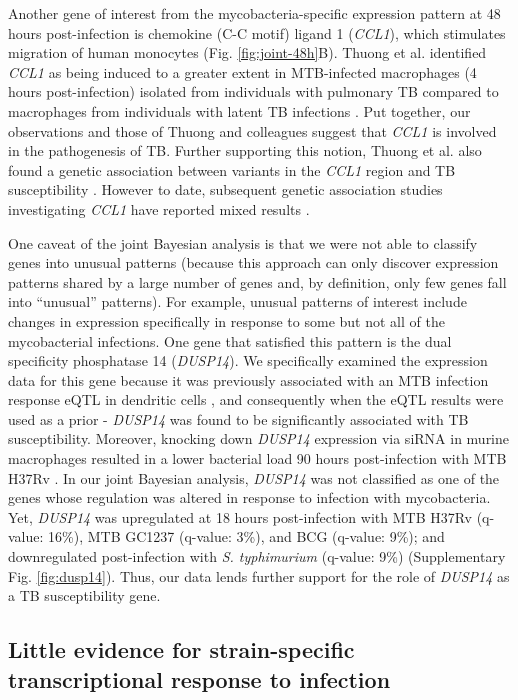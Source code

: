 Another gene of interest from the mycobacteria-specific expression
pattern at 48 hours post-infection is chemokine (C-C motif) ligand 1
(\emph{CCL1}), which stimulates migration of human monocytes
\citep{Miller1992} (Fig. \ref{fig:joint-48h}B). Thuong et al. identified \emph{CCL1} as
being induced to a greater extent in MTB-infected macrophages (4 hours
post-infection) isolated from individuals with pulmonary TB compared to
macrophages from individuals with latent TB infections
\citep{Thuong2008}. Put together, our observations and those of Thuong
and colleagues suggest that \emph{CCL1} is involved in the pathogenesis
of TB. Further supporting this notion, Thuong et al. also found a
genetic association between variants in the \emph{CCL1} region and TB
susceptibility \citep{Thuong2008}. However to date, subsequent genetic
association studies investigating \emph{CCL1} have reported mixed
results \citep{Tang2011, Ozdemir2013}.

One caveat of the joint Bayesian analysis is that we were not able to
classify genes into unusual patterns (because this approach can only
discover expression patterns shared by a large number of genes and, by
definition, only few genes fall into ``unusual'' patterns). For example,
unusual patterns of interest include changes in expression specifically
in response to some but not all of the mycobacterial infections. One
gene that satisfied this pattern is the dual specificity phosphatase 14
(\emph{DUSP14}). We specifically examined the expression data for this
gene because it was previously associated with an MTB infection response
eQTL in dendritic cells \citep{Barreiro2012}, and consequently when the
eQTL results were used as a prior - \emph{DUSP14} was found to be
significantly associated with TB susceptibility. Moreover, knocking down
\emph{DUSP14} expression via siRNA in murine macrophages resulted in a
lower bacterial load 90 hours post-infection with MTB H37Rv
\citep{Jayaswal2010}. In our joint Bayesian analysis, \emph{DUSP14} was
not classified as one of the genes whose regulation was altered in
response to infection with mycobacteria. Yet, \emph{DUSP14} was
upregulated at 18 hours post-infection with MTB H37Rv (q-value: 16\%),
MTB GC1237 (q-value: 3\%), and BCG (q-value: 9\%); and downregulated
post-infection with \emph{S. typhimurium} (q-value: 9\%) (Supplementary
Fig. \ref{fig:dusp14}). Thus, our data lends further support for the role of
\emph{DUSP14} as a TB susceptibility gene.

\subsection{Little evidence for strain-specific transcriptional
response to
infection}\label{little-evidence-for-strain-specific-transcriptional-response-to-infection}


